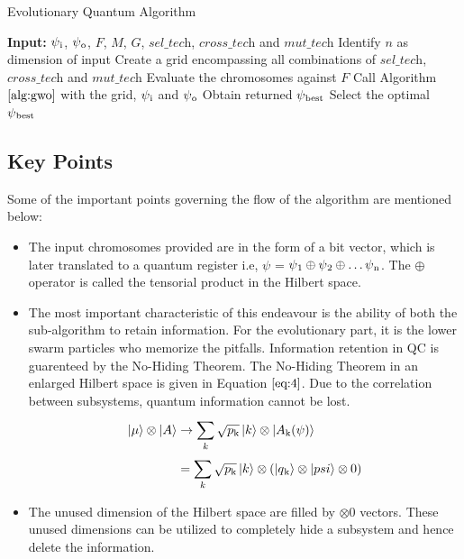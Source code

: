 \documentclass[conference]{IEEEtran}
\begin{document}
\begin{algorithm}[!b]
\footnotesize
\caption{Evolutionary Quantum Algorithm}
\label{alg:eq}
\begin{algorithmic}[1]
\STATE \textbf{Input:} $\psi\textsubscript{i}$, $\psi\textsubscript{o}$, $\textit{F}$, $\textit{M}$, $\textit{G}$, $\textit{sel\_tech}$, $\textit{cross\_tech}$ and $\textit{mut\_tech}$
\STATE Identify $\textit{n}$ as dimension of input
\STATE Create a grid encompassing all combinations of $\textit{sel\_tech}$, $\textit{cross\_tech}$ and $\textit{mut\_tech}$
\STATE Evaluate the chromosomes against $\textit{F}$
\STATE Call Algorithm $\ref{alg:gwo}$ with the grid, $\psi\textsubscript{i}$ and $\psi\textsubscript{o}$ 
\STATE Obtain returned $\psi\textsubscript{best}$
\ENDFOR
\STATE Select the optimal $\psi\textsubscript{best}$
\end{algorithmic}
\end{algorithm}

\subsection{Key Points}
Some of the important points governing the flow of the algorithm are mentioned below:

\begin{itemize}
\item The input chromosomes provided are in the form of a bit vector, which is later translated to a quantum register i.e, $\psi$ = $\psi\textsubscript{1} \oplus \psi\textsubscript{2} \oplus \dots \psi\textsubscript{n}$. The $\oplus$ operator is called the tensorial product in the Hilbert space.

\item The most important characteristic of this endeavour is the ability of both the sub-algorithm to retain information. For the evolutionary part, it is the lower swarm particles who memorize the pitfalls. Information retention in QC is guarenteed by the No-Hiding Theorem. The No-Hiding Theorem in an enlarged Hilbert space is given in Equation $\ref{eq:4}$. Due to the correlation between subsystems, quantum information cannot be lost. 
{\scriptsize
\begin{equation}
\label{eq:4}
\begin{split}
\ket{\mu} \otimes \ket{A} & \rightarrow \sum_{k}^{}\sqrt{p\textsubscript{k}}\ket{k} \otimes \ket{A\textsubscript{k}(\psi)}\\
& = \sum_{k}^{}\sqrt{p\textsubscript{k}}\ket{k} \otimes (\ket{q\textsubscript{k}} \otimes \ket{psi} \otimes 0)
\end{split}
\end{equation}
}%
\item The unused dimension of the Hilbert space are filled by $\otimes 0$ vectors. These unused dimensions can be utilized to completely hide a subsystem and hence delete the information.
\end{itemize}
\end{document}
